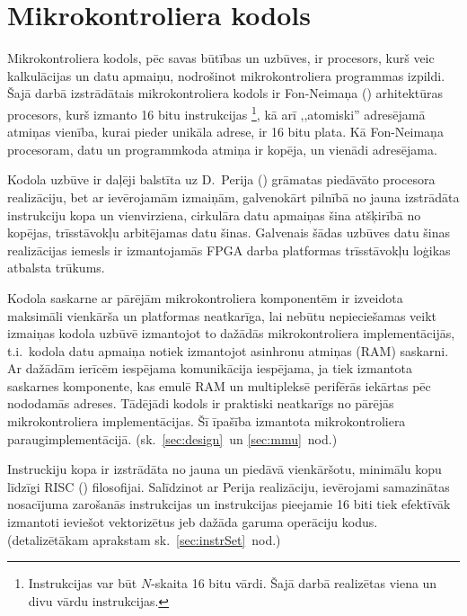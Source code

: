 \section{Mikrokontroliera kodols} \label{sec:cpu}
	Mikrokontroliera kodols, pēc savas būtības un uzbūves, ir procesors,
	kurš veic kalkulācijas un datu apmaiņu, nodrošinot mikrokontroliera
	programmas izpildi.
	Šajā darbā izstrādātais mikrokontroliera kodols ir 
	Fon-Neimaņa () arhitektūras pro\-ce\-sors, kurš
	izmanto 16 bitu instrukcijas%
		\footnote{Instrukcijas var būt $N$-skaita 16 bitu vārdi. 
		Šajā darbā realizētas viena un divu vārdu instrukcijas.},
	kā arī ,,atomiski'' adresējamā atmiņas vienība, kurai pieder unikāla
	adrese, ir 16 bitu plata. Kā Fon-Neimaņa procesoram, datu un
	programmkoda atmiņa ir kopēja, un vienādi adresējama.
	
	Kodola uzbūve ir daļēji balstīta uz D.~Perija () grāmatas%
	 piedāvāto procesora reali\-zā\-ciju, 
	bet ar ievērojamām izmaiņām, galvenokārt pilnībā no jauna izstrādāta 
	instrukciju kopa un vienvirziena,
	cirkulāra datu apmaiņas šina atšķirībā no kopējas,
	trīs\-stāvokļu arbitējamas datu šinas.
	Galvenais šādas uzbūves datu šinas realizācijas iemesls
	ir izmantojamās  FPGA darba platformas trīs\-stāvokļu
	loģikas atbalsta \mbox{trūkums.\cite[18.~lpp.]{FusionFAQ}}
	
	Kodola saskarne ar pārējām mikrokontroliera komponentēm ir izveidota
	maksimāli vienkārša un platformas neatkarīga, lai nebūtu nepieciešamas
	veikt izmaiņas kodola uzbūvē izmantojot to dažādās mikrokontroliera
	implementācijās, t.i.~kodola datu apmaiņa notiek izmantojot
	asinhronu atmiņas (RAM)	saskarni. Ar dažādām ierīcēm iespējama
	komunikācija iespējama, ja tiek izmantota saskarnes komponente, kas
	emulē RAM un multipleksē perifērās iekārtas pēc nododamās adreses.
	Tādējādi kodols	ir praktiski neatkarīgs no pārējās 
	mikrokontroliera implementācijas.
	Šī īpašība izmantota mikrokontroliera paraugimplementācijā.
	(sk.~\ref{sec:design}~un \ref{sec:mmu}~nod.)
	
	Instruckiju kopa ir izstrādāta no jauna un piedāvā vienkāršotu,
	mini\-mālu kopu līdzīgi RISC ()
	filo\-so\-fijai. Salīdzinot ar Perija realizāciju, ievērojami samazinātas
	nosacījuma zarošanās instrukcijas un instrukcijas pieejamie 16 biti
	tiek efektīvāk izmantoti ieviešot vektorizētus jeb dažāda garuma
	operāciju kodus. (detalizētākam aprakstam sk.~\ref{sec:instrSet}~nod.)
	
